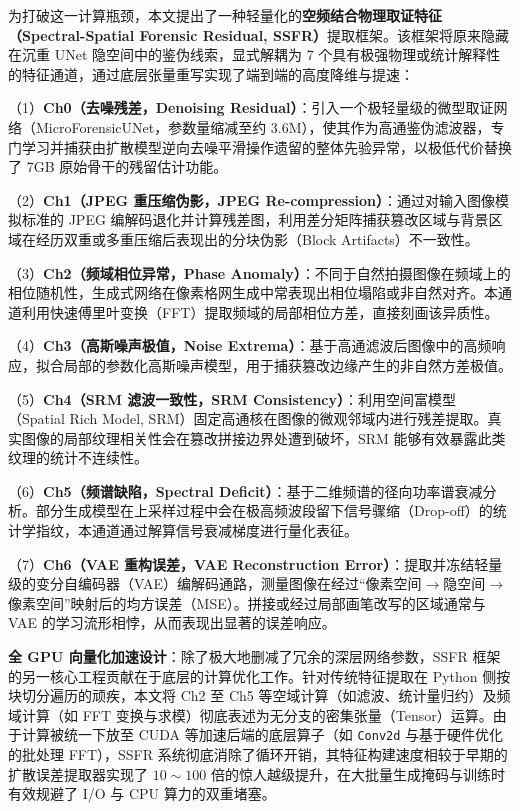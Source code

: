 \documentclass[10pt,a4paper,twocolumn]{ctexart}
\begin{document}
为打破这一计算瓶颈，本文提出了一种轻量化的\textbf{空频结合物理取证特征（Spectral-Spatial Forensic Residual, SSFR）}提取框架。该框架将原来隐藏在沉重 UNet 隐空间中的鉴伪线索，显式解耦为 7 个具有极强物理或统计解释性的特征通道，通过底层张量重写实现了端到端的高度降维与提速：

（1）\textbf{Ch0（去噪残差，Denoising Residual）}：引入一个极轻量级的微型取证网络（MicroForensicUNet，参数量缩减至约 3.6M），使其作为高通鉴伪滤波器，专门学习并捕获由扩散模型逆向去噪平滑操作遗留的整体先验异常，以极低代价替换了 7GB 原始骨干的残留估计功能。

（2）\textbf{Ch1（JPEG 重压缩伪影，JPEG Re-compression）}：通过对输入图像模拟标准的 JPEG 编解码退化并计算残差图，利用差分矩阵捕获篡改区域与背景区域在经历双重或多重压缩后表现出的分块伪影（Block Artifacts）不一致性。

（3）\textbf{Ch2（频域相位异常，Phase Anomaly）}：不同于自然拍摄图像在频域上的相位随机性，生成式网络在像素格网生成中常表现出相位塌陷或非自然对齐。本通道利用快速傅里叶变换（FFT）提取频域的局部相位方差，直接刻画该异质性。

（4）\textbf{Ch3（高斯噪声极值，Noise Extrema）}：基于高通滤波后图像中的高频响应，拟合局部的参数化高斯噪声模型，用于捕获篡改边缘产生的非自然方差极值。

（5）\textbf{Ch4（SRM 滤波一致性，SRM Consistency）}：利用空间富模型（Spatial Rich Model, SRM）固定高通核在图像的微观邻域内进行残差提取。真实图像的局部纹理相关性会在篡改拼接边界处遭到破坏，SRM 能够有效暴露此类纹理的统计不连续性。

（6）\textbf{Ch5（频谱缺陷，Spectral Deficit）}：基于二维频谱的径向功率谱衰减分析。部分生成模型在上采样过程中会在极高频波段留下信号骤缩（Drop-off）的统计学指纹，本通道通过解算信号衰减梯度进行量化表征。

（7）\textbf{Ch6（VAE 重构误差，VAE Reconstruction Error）}：提取并冻结轻量级的变分自编码器（VAE）编解码通路，测量图像在经过“像素空间$\rightarrow$隐空间$\rightarrow$像素空间”映射后的均方误差（MSE）。拼接或经过局部画笔改写的区域通常与 VAE 的学习流形相悖，从而表现出显著的误差响应。

\textbf{全 GPU 向量化加速设计}：除了极大地删减了冗余的深层网络参数，SSFR 框架的另一核心工程贡献在于底层的计算优化工作。针对传统特征提取在 Python 侧按块切分遍历的顽疾，本文将 Ch2 至 Ch5 等空域计算（如滤波、统计量归约）及频域计算（如 FFT 变换与求模）彻底表述为无分支的密集张量（Tensor）运算。由于计算被统一下放至 CUDA 等加速后端的底层算子（如 \texttt{Conv2d} 与基于硬件优化的批处理 FFT），SSFR 系统彻底消除了循环开销，其特征构建速度相较于早期的扩散误差提取器实现了 $10 \sim 100$ 倍的惊人越级提升，在大批量生成掩码与训练时有效规避了 I/O 与 CPU 算力的双重堵塞。
\end{document}
